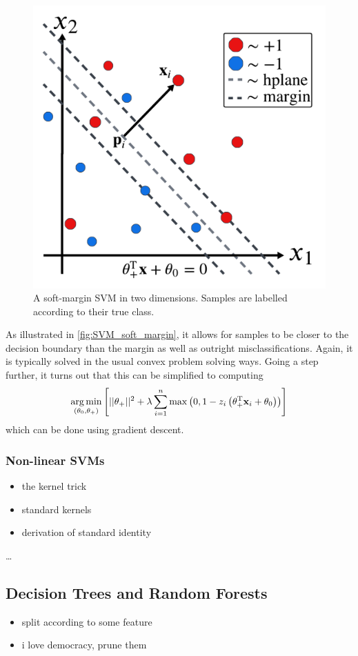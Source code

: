 \documentclass[11pt]{article}
\begin{document}
\begin{figure}[ht]
    \centering
    \includegraphics[width=0.75\columnwidth]{./figures/SVMs/SVM_soft_margin.pdf}
    \caption{A soft-margin SVM in two dimensions. Samples are labelled according to their true class.}
    \label{fig:SVM_soft_margin}
\end{figure}

\noindent As illustrated in \autoref{fig:SVM_soft_margin}, it allows for samples to be closer to the decision boundary than the margin as well as outright misclassifications. Again, it is typically solved in the usual convex problem solving ways. Going a step further, it turns out that this can be simplified to computing
$$
\operatorname*{arg\,min}_{(\theta_0,\theta_+)}\left[||\theta_+||^2+\lambda\sum_{i=1}^n\max\left(0,1-z_i\left(\theta_+^{\text{T}}\mathbf{x}_i+\theta_0\right)\right)\right]
$$
which can be done using gradient descent.

\subsubsection{Non-linear SVMs}
\begin{itemize}
    \item the kernel trick
    \item standard kernels
    \item derivation of standard identity
\end{itemize}
\dots

\subsection{Decision Trees and Random Forests}
\begin{itemize}
    \item split according to some feature
    \item i love democracy, prune them
\end{itemize}
\end{document}

